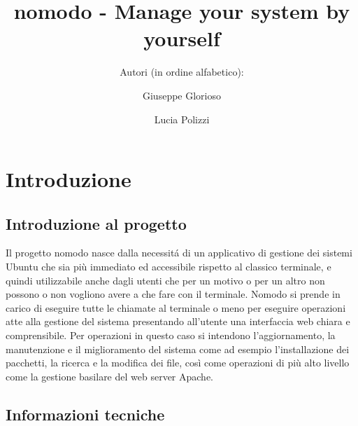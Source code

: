 \documentclass[11pt]{article}
\title{nomodo - Manage your system by yourself}
\author{Autori (in ordine alfabetico): \and Giuseppe Glorioso \and Lucia Polizzi}
\begin{document}
\maketitle
{}

\newpage
\tableofcontents
{}

\newpage

\section{Introduzione}

\subsection{Introduzione al progetto}
Il progetto nomodo nasce dalla necessit\'a di un applicativo di gestione dei sistemi Ubuntu che sia più immediato ed accessibile
rispetto al classico terminale, e quindi utilizzabile anche dagli utenti che per un motivo o per un altro
non possono o non vogliono avere a che fare con il terminale.
Nomodo si prende in carico di eseguire tutte le chiamate al terminale o meno per eseguire operazioni atte alla gestione del sistema
presentando all'utente una interfaccia web chiara e comprensibile.
Per operazioni in questo caso si intendono l'aggiornamento, la manutenzione e il miglioramento del sistema come ad esempio
l'installazione dei pacchetti, la ricerca e la modifica dei file, così come operazioni di più alto livello come
la gestione basilare del web server Apache.

\subsection{Informazioni tecniche}
\end{document}
